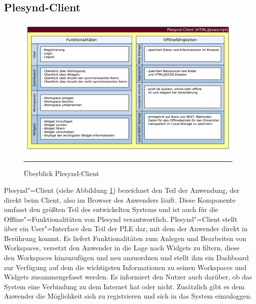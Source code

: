 \subsection{Plesynd-Client}
\begin{figure}
  \centering
  \includegraphics[width=\textwidth,keepaspectratio]{./Figures/konzeptionelle_loesung_plesynd_client.pdf}
    \rule{35em}{0.5pt}
  \caption[Überblick Plesynd-Client]{Überblick Plesynd-Client}
  \label{fig:ueberblick_plesynd_client}
\end{figure}
Plesynd"=Client (siehe Abbildung \ref{fig:ueberblick_plesynd_client}) bezeichnet den Teil der Anwendung, der direkt beim Client, also im Browser des Anwenders läuft. Diese Komponente umfasst den größten Teil des entwickelten Systems und ist auch für die Offline"=Funktionalitäten von Plesynd verantwortlich. Plesynd"=Client stellt über ein User"=Interface den Teil der \ac{PLE} dar, mit dem der Anwender direkt in Berührung kommt. Es liefert Funktionalitäten zum Anlegen und Bearbeiten von Workspaces, versetzt den Anwender in die Lage nach Widgets zu filtern, diese den Workspaces hinzuzufügen und neu anzuordnen und stellt ihm ein Dashboard zur Verfügung auf dem die wichtigsten Informationen zu seinen Workspaces und Widgets zusammengefasst werden. Es informiert den Nutzer auch darüber, ob das System eine Verbindung zu dem Internet hat oder nicht. Zusätzlich gibt es dem Anwender die Möglichkeit sich zu registrieren und sich in das System einzuloggen. 

